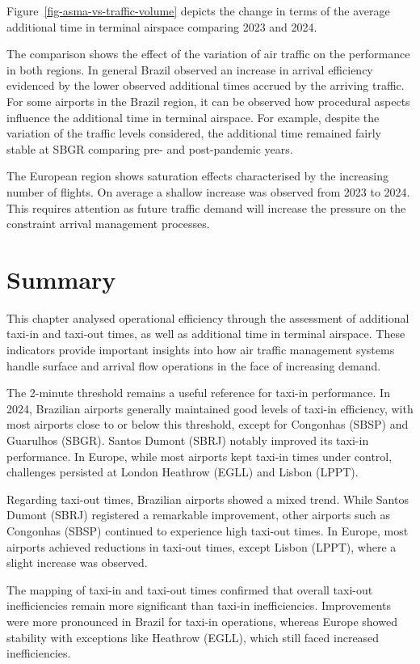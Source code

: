 \documentclass[
  a4paper,
  DIV=11,
  numbers=noendperiod]{scrreport}
\begin{document}
Figure~\ref{fig-asma-vs-traffic-volume} depicts the change in terms of
the average additional time in terminal airspace comparing 2023 and
2024.

The comparison shows the effect of the variation of air traffic on the
performance in both regions. In general Brazil observed an increase in
arrival efficiency evidenced by the lower observed additional times
accrued by the arriving traffic. For some airports in the Brazil region,
it can be observed how procedural aspects influence the additional time
in terminal airspace. For example, despite the variation of the traffic
levels considered, the additional time remained fairly stable at SBGR
comparing pre- and post-pandemic years.

The European region shows saturation effects characterised by the
increasing number of flights. On average a shallow increase was observed
from 2023 to 2024. This requires attention as future traffic demand will
increase the pressure on the constraint arrival management processes.

\section{Summary}\label{summary-4}

This chapter analysed operational efficiency through the assessment of
additional taxi-in and taxi-out times, as well as additional time in
terminal airspace. These indicators provide important insights into how
air traffic management systems handle surface and arrival flow
operations in the face of increasing demand.

The 2-minute threshold remains a useful reference for taxi-in
performance. In 2024, Brazilian airports generally maintained good
levels of taxi-in efficiency, with most airports close to or below this
threshold, except for Congonhas (SBSP) and Guarulhos (SBGR). Santos
Dumont (SBRJ) notably improved its taxi-in performance. In Europe, while
most airports kept taxi-in times under control, challenges persisted at
London Heathrow (EGLL) and Lisbon (LPPT).

Regarding taxi-out times, Brazilian airports showed a mixed trend. While
Santos Dumont (SBRJ) registered a remarkable improvement, other airports
such as Congonhas (SBSP) continued to experience high taxi-out times. In
Europe, most airports achieved reductions in taxi-out times, except
Lisbon (LPPT), where a slight increase was observed.

The mapping of taxi-in and taxi-out times confirmed that overall
taxi-out inefficiencies remain more significant than taxi-in
inefficiencies. Improvements were more pronounced in Brazil for taxi-in
operations, whereas Europe showed stability with exceptions like
Heathrow (EGLL), which still faced increased inefficiencies.
\end{document}
